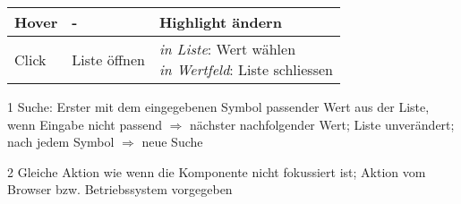 \begin{table}[!htb]
\begin{adjustbox}{max width=\textwidth}
\begin{threeparttable}
\begin{tabular}{ l || l | l }
                \hline
                Hover      & -                & Highlight ändern \\
                \hline
                Click      & Liste öffnen     & \tbbr{\emph{in Liste}: Wert wählen \\
                                                    \emph{in Wertfeld}: Liste schliessen} \\
                \hline
            \end{tabular}
            \begin{tablenotes}
                \scriptsize
                \item[1] Suche: Erster mit dem eingegebenen Symbol passender Wert aus der Liste, wenn Eingabe nicht passend $\Rightarrow$ nächster nachfolgender Wert; 
                                Liste unverändert; nach jedem Symbol $\Rightarrow$ neue Suche
                \item[2] Gleiche Aktion wie wenn die Komponente nicht fokussiert ist; Aktion vom Browser bzw. Betriebssystem vorgegeben
            \end{tablenotes}
        \end{threeparttable}
    \end{adjustbox}
\end{table}
